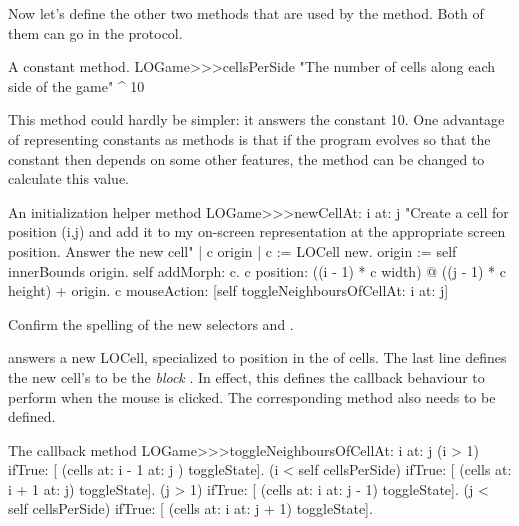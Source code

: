 \documentclass[a4paper,10pt,twoside]{book}
\begin{document}
Now let's define the other two methods that are used by the  method. Both of them can go in the  protocol.

\begin{method}[sbegamecellsperside]{A constant method.}
LOGame>>>cellsPerSide
   "The number of cells along each side of the game"
   ^ 10
\end{method}

This method could hardly be simpler: it answers the constant 10.  One advantage of representing constants as methods is that if the program evolves so that the constant then depends on some other features, the method can be changed to calculate this value.

\begin{method}[newCellAt:at:]{An initialization helper method}
LOGame>>>newCellAt: i at: j
   "Create a cell for position (i,j) and add it to my on-screen
   representation at the appropriate screen position.  Answer the new cell"
   | c origin |
   c := LOCell new.
   origin := self innerBounds origin.
   self addMorph: c.
   c position: ((i - 1) * c width) @ ((j - 1) * c height) + origin.
   c mouseAction: [self toggleNeighboursOfCellAt: i at: j]
\end{method}

Confirm the spelling of the new selectors  and .

 answers a new LOCell, specialized to position  in the  of cells.
The last line defines the new cell's  to be the \emph{block}
\mbox{.}
 In effect, this defines the callback behaviour to perform when the mouse is clicked.
The corresponding method also needs to be defined.

\begin{method}[toggleNeighboursOfCellAt:at:]{The callback method}
LOGame>>>toggleNeighboursOfCellAt: i at: j
   (i > 1) ifTrue: [ (cells at: i - 1 at: j ) toggleState].
   (i < self cellsPerSide) ifTrue: [ (cells at: i + 1 at: j) toggleState].
   (j > 1) ifTrue: [ (cells at: i  at: j - 1) toggleState].
   (j < self cellsPerSide) ifTrue: [ (cells at: i at: j + 1) toggleState].
\end{method}
\end{document}
